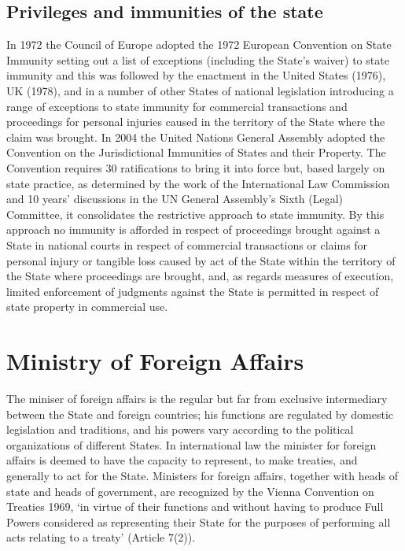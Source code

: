 \documentclass[
  openany]{book}
\begin{document}
\hypertarget{privileges-and-immunities-of-the-state}{%
\subsection{Privileges and immunities of the state}\label{privileges-and-immunities-of-the-state}}

In 1972 the Council of Europe adopted the 1972 European Convention on State Immunity setting out a list of exceptions (including the State's waiver) to state immunity and this was followed by the enactment in the United States (1976), UK (1978), and in a number of other States of national legislation introducing a range of exceptions to state immunity for commercial transactions and proceedings for personal injuries caused in the territory of the State where the claim was brought. In 2004 the United Nations General Assembly adopted the Convention on the Jurisdictional Immunities of States and their Property. The Convention requires 30 ratifications to bring it into force but, based largely on state practice, as determined by the work of the International Law Commission and 10 years' discussions in the UN General Assembly's Sixth (Legal) Committee, it consolidates the restrictive approach to state immunity. By this approach no immunity is afforded in respect of proceedings brought against a State in national courts in respect of commercial transactions or claims for personal injury or tangible loss caused by act of the State within the territory of the State where proceedings are brought, and, as regards measures of execution, limited enforcement of judgments against the State is permitted in respect of state property in commercial use.

\hypertarget{ministry-of-foreign-affairs}{%
\section{Ministry of Foreign Affairs}\label{ministry-of-foreign-affairs}}

The miniser of foreign affairs is the regular but far from exclusive intermediary between the State and foreign countries; his functions are regulated by domestic legislation and traditions, and his powers vary according to the political organizations of different States. In international law the minister for foreign affairs is deemed to have the capacity to represent, to make treaties, and generally to act for the State. Ministers for foreign affairs, together with heads of state and heads of government, are recognized by the Vienna Convention on Treaties 1969, `in virtue of their functions and without having to produce Full Powers considered as representing their State for the purposes of performing all acts relating to a treaty' (Article 7(2)).
\end{document}
